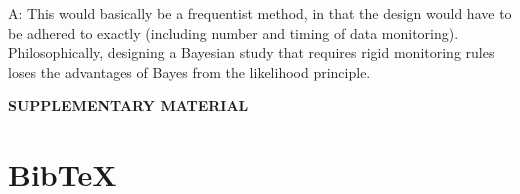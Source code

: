 \documentclass[12pt]{article}
\begin{document}
A: This would basically be a frequentist method, in that the design would have to be adhered to exactly (including number and timing of data monitoring). Philosophically, designing a Bayesian study that requires rigid monitoring rules loses the advantages of Bayes from the likelihood principle.
%
%
%
%
%				
%
%


%
			
	

\newpage
\begin{center}
{\large\bf SUPPLEMENTARY MATERIAL}
\end{center}


\section{BibTeX}

 
 		
\end{document}
